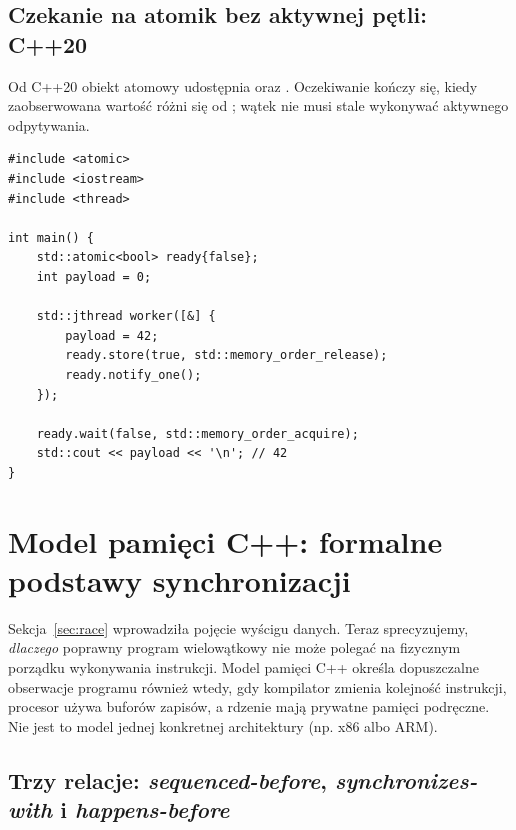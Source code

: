 \subsection{Czekanie na atomik bez aktywnej pętli: C++20}

Od C++20 obiekt atomowy udostępnia  oraz
. Oczekiwanie kończy się, kiedy
zaobserwowana wartość różni się od ; wątek nie musi stale
wykonywać aktywnego odpytywania.

\begin{lstlisting}[caption={Atomowe czekanie i wybudzanie (C++20).}]
#include <atomic>
#include <iostream>
#include <thread>

int main() {
    std::atomic<bool> ready{false};
    int payload = 0;

    std::jthread worker([&] {
        payload = 42;
        ready.store(true, std::memory_order_release);
        ready.notify_one();
    });

    ready.wait(false, std::memory_order_acquire);
    std::cout << payload << '\n'; // 42
}
\end{lstlisting}


\section{Model pamięci C++: formalne podstawy synchronizacji}
\label{sec:advanced-memory-model}

Sekcja~\ref{sec:race} wprowadziła pojęcie wyścigu danych. Teraz sprecyzujemy,
\emph{dlaczego} poprawny program wielowątkowy nie może polegać na fizycznym
porządku wykonywania instrukcji. Model pamięci C++ określa dopuszczalne
obserwacje programu również wtedy, gdy kompilator zmienia kolejność instrukcji,
procesor używa buforów zapisów, a rdzenie mają prywatne pamięci podręczne.
Nie jest to model jednej konkretnej architektury (np. x86 albo ARM).

\subsection{Trzy relacje: \emph{sequenced-before}, \emph{synchronizes-with} i \emph{happens-before}}

